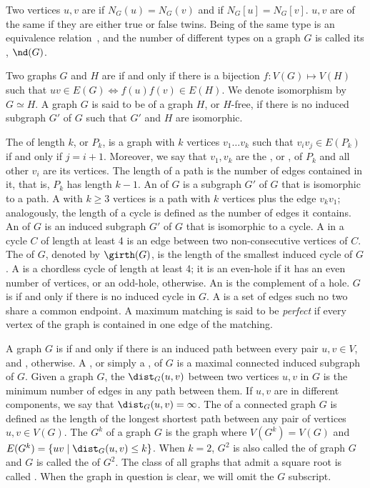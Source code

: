 Two vertices $u,v$ are  if $N_G(u) = N_G(v)$ and  if $N_G[u] = N_G[v]$. $u,v$ are of the same  if they are either true or false twins.
Being of the same type is an equivalence relation~\citep{neighborhood_diversity}, and the number of different types on a graph $G$ is called its , $\nd(G)$.

Two graphs $G$ and $H$ are  if and only if there is a bijection $f: V(G) \mapsto V(H)$ such that $uv \in E(G) \Leftrightarrow f(u)f(v) \in E(H)$.
We denote isomorphism by $G \simeq H$.
A graph $G$ is said to be  of a graph $H$, or $H$-free, if there is no induced subgraph $G'$ of $G$ such that $G'$ and $H$ are isomorphic.

The  of length $k$, or $P_k$, is a graph with $k$ vertices $v_1 \dots v_k$ such that $v_iv_j \in E(P_k)$ if and only if $j = i+1$. Moreover, we say that $v_1, v_k$ are the , or , of $P_k$ and all other $v_i$ are its  vertices.
The length of a path is the number of edges contained in it, that is, $P_k$ has length $k-1$.
An  of $G$ is a subgraph $G'$ of $G$ that is isomorphic to a path.
A  with  $k \geq 3$ vertices is a path with $k$ vertices plus the edge $v_kv_1$; analogously, the length of a cycle is defined as the number of edges it contains.
An  of $G$ is an induced subgraph $G'$ of $G$ that is isomorphic to a cycle.
A  in a cycle $C$ of length at least 4 is an edge between two non-consecutive vertices of $C$.
The  of $G$, denoted by $\girth(G)$, is the length of the smallest induced cycle of $G$.
A  is a chordless cycle of length at least 4; it is an even-hole if it has an even number of vertices, or an odd-hole, otherwise. An  is the complement of a hole.
$G$ is  if and only if there is no induced cycle in $G$.
A  is a set of edges such no two share a common endpoint.
A maximum matching is said to be \textit{perfect} if every vertex of the graph is contained in one edge of the matching.

A graph $G$ is  if and only if there is an induced path between every pair $u,v \in V$, and , otherwise.
A , or simply a , of $G$ is a maximal connected induced subgraph of $G$.
Given a graph $G$, the  $\dist_G(u,v)$ between two vertices $u,v$ in $G$ is the minimum number of edges in any path between them.
If $u,v$ are in different components, we say that $\dist_G(u,v) = \infty$.
The  of a connected graph $G$ is defined as the length of the longest shortest path between any pair of vertices $u,v \in V(G)$.
The  $G^k$ of a graph $G$ is the graph where $V(G^k) = V(G)$ and $E(G^k) = \{uv \mid \dist_G(u,v) \leq k\}$.
When $k = 2$, $G^2$ is also called the  of graph $G$ and $G$ is called the  of $G^2$.
The class of all graphs that admit a square root is called .
When the graph in question is clear, we will omit the $G$ subscript.

